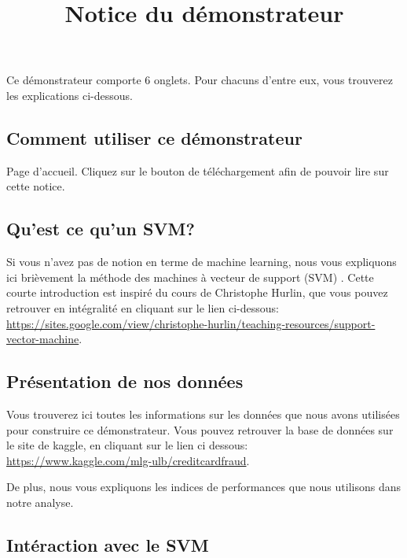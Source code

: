 \documentclass[]{article}
\title{Notice du démonstrateur}
\author{}
\date{}
\begin{document}
\maketitle

Ce démonstrateur comporte 6 onglets. Pour chacuns d'entre eux, vous
trouverez les explications ci-dessous.

\hypertarget{comment-utiliser-ce-duxe9monstrateur}{%
\subsection{Comment utiliser ce
démonstrateur}\label{comment-utiliser-ce-duxe9monstrateur}}

Page d'accueil. Cliquez sur le bouton de téléchargement afin de pouvoir
lire sur cette notice.

\hypertarget{quest-ce-quun-svm}{%
\subsection{Qu'est ce qu'un SVM?}\label{quest-ce-quun-svm}}

Si vous n'avez pas de notion en terme de machine learning, nous vous
expliquons ici brièvement la méthode des machines à vecteur de support
(SVM) . Cette courte introduction est inspiré du cours de Christophe
Hurlin, que vous pouvez retrouver en intégralité en cliquant sur le lien
ci-dessous:\\
\url{https://sites.google.com/view/christophe-hurlin/teaching-resources/support-vector-machine}.

\hypertarget{pruxe9sentation-de-nos-donnuxe9es}{%
\subsection{Présentation de nos
données}\label{pruxe9sentation-de-nos-donnuxe9es}}

Vous trouverez ici toutes les informations sur les données que nous
avons utilisées pour construire ce démonstrateur. Vous pouvez retrouver
la base de données sur le site de kaggle, en cliquant sur le lien ci
dessous:\\
\url{https://www.kaggle.com/mlg-ulb/creditcardfraud}.

De plus, nous vous expliquons les indices de performances que nous
utilisons dans notre analyse.

\hypertarget{intuxe9raction-avec-le-svm}{%
\subsection{Intéraction avec le SVM}\label{intuxe9raction-avec-le-svm}}
\end{document}
